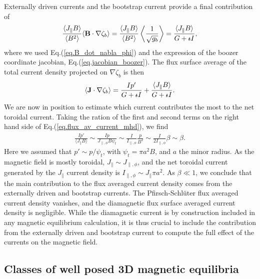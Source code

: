 \documentclass[my_thesis.tex]{subfiles}
\begin{document}
Externally driven currents and the bootstrap current provide a final contribution of 
\begin{equation}
	\frac{\langle J_\parallel B\rangle}{\langle B^2\rangle}\langle \mathbf{B}\cdot\nabla\zeta_b\rangle =  \frac{\langle J_\parallel B\rangle}{\langle B^2\rangle} \left\langle\frac{1}{\sqrt{g_b}}\right\rangle = \frac{\langle J_\parallel B\rangle}{G + \text{$\iota\!\!$-} I},
\end{equation}
where we used Eq.(\ref{eq.B_dot_nabla_phi}) and the expression of the boozer coordinate jacobian, Eq.(\ref{eq.jacobian_boozer}). The flux surface average of the total current density projected on $\nabla\zeta_b$ is then
\begin{equation}
	\langle \mathbf{J}\cdot\nabla\zeta_b\rangle =  \frac{Ip'}{G+\text{$\iota\!\!$-} I} + \frac{\langle J_\parallel B\rangle}{G + \text{$\iota\!\!$-} I}. \label{eq.flux_av_current_mhd}
\end{equation}
We are now in position to estimate which current contributes the most to the net toroidal current. Taking the ration of the first and second terms on the right hand side of Eq.(\ref{eq.flux_av_current_mhd}), we find
\begin{align}
	\frac{I p'}{\langle J_\parallel B\rangle} \sim \frac{I p }{J_{\parallel,\phi} B \psi_{t}} \sim \frac{I}{I_{\parallel,\phi}} \frac{p}{B^2} \sim \frac{I}{2I_{\parallel,\phi}}  \beta \sim \beta.
\end{align}
Here we assumed that $p'\sim p/\psi_t$, with $\psi_t=\pi a^2 B$, and $a$ the minor radius. As the magnetic field is mostly toroidal, $J_{\parallel}\sim J_{\parallel,\phi}$, and the net toroidal current generated by the $J_\parallel$ current density is $I_{\parallel,\phi}\sim J_{\parallel} \pi a^2$. As $\beta\ll 1$, we conclude that the main contribution to the flux averaged current density comes from the externally driven and bootstrap currents. The Pfirsch-Schl\"uter flux averaged current density vanishes, and the diamagnetic flux surface averaged current density is negligible. While the diamagnetic current is by construction included in any magnetic equilibrium calculation, it is thus crucial to include the contribution from the externally driven and bootstrap current to compute the full effect of the currents on the magnetic field.




\subsection{Classes of well posed 3D magnetic equilibria}\label{sec. diverging currents}
\end{document}
